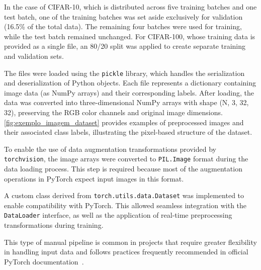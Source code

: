 \documentclass[journal,article,submit,pdftex,moreauthors]{Definitions/mdpi}
\begin{document}
In the case of CIFAR-10, which is distributed across five training batches and one test batch, one of the training batches was set aside exclusively for validation (16.5\% of the total data). The remaining four batches were used for training, while the test batch remained unchanged. For CIFAR-100, whose training data is provided as a single file, an 80/20 split was applied to create separate training and validation sets.

The files were loaded using the \texttt{pickle} library, which handles the serialization and deserialization of Python objects. Each file represents a dictionary containing image data (as NumPy arrays) and their corresponding labels. After loading, the data was converted into three-dimensional NumPy arrays with shape (N, 3, 32, 32), preserving the RGB color channels and original image dimensions. \autoref{fig:exemplo_imagem_dataset} provides examples of preprocessed images and their associated class labels, illustrating the pixel-based structure of the dataset.

To enable the use of data augmentation transformations provided by \texttt{torchvision}, the image arrays were converted to \texttt{PIL.Image} format during the data loading process. This step is required because most of the augmentation operations in PyTorch expect input images in this format.

A custom class derived from \texttt{torch.utils.data.Dataset} was implemented to enable compatibility with PyTorch. This allowed seamless integration with the \texttt{DataLoader} interface, as well as the application of real-time preprocessing transformations during training.

This type of manual pipeline is common in projects that require greater flexibility in handling input data and follows practices frequently recommended in official PyTorch documentation~\cite{pytorchdocs}.
\end{document}
